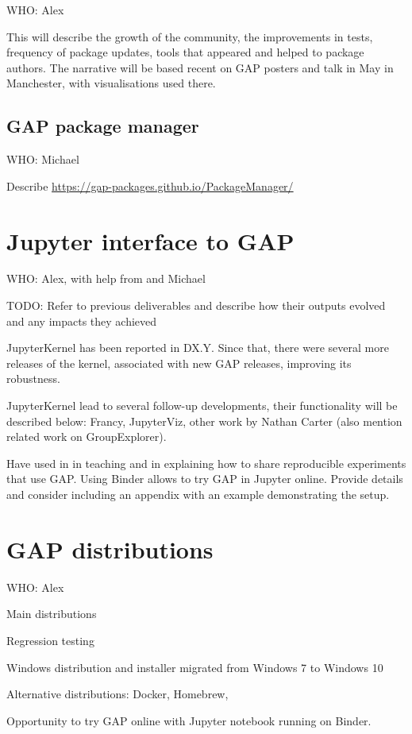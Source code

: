 \documentclass{deliverablereport}
\begin{document}
WHO: Alex

This will describe the growth of the community, the improvements in tests, frequency
of package updates, tools that appeared and helped to package authors. The narrative
will be based recent on GAP posters and talk in May in Manchester, with visualisations
used there.

\subsection{GAP package manager}

WHO: Michael

Describe \url{https://gap-packages.github.io/PackageManager/}


\section{Jupyter interface to GAP}

WHO: Alex, with help from and Michael

TODO: Refer to previous deliverables and describe how their outputs
evolved and any impacts they achieved

JupyterKernel has been reported in DX.Y. Since that, there were
several more releases of the kernel, associated with new GAP
releases, improving its robustness. 

JupyterKernel lead to several follow-up developments, their
functionality will be described below: Francy, JupyterViz,
other work by Nathan Carter (also mention related work on
GroupExplorer).

Have used in in teaching and in explaining how to share 
reproducible experiments that use GAP. Using Binder
allows to try GAP in Jupyter online. Provide details
and consider including an appendix with an example 
demonstrating the setup.

\section{GAP distributions}

WHO: Alex

Main distributions

Regression testing

Windows distribution and installer migrated from Windows 7 to Windows 10

Alternative distributions: Docker, Homebrew, 

Opportunity to try GAP online with Jupyter notebook running on Binder.
\end{document}
